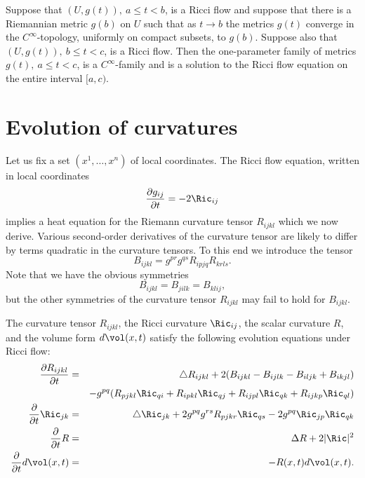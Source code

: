\begin{proposition}\label{prop:smooth-patching}
\label{patch}

 Suppose that $(U,g(t)),\ a\le t<b$, is a Ricci flow and suppose that
 there is a Riemannian metric $g(b)$ on $U$ such that
 as $t\rightarrow b$ the metrics $g(t)$ converge in the $C^\infty$-topology, uniformly
 on compact subsets, to $g(b)$. Suppose also that $(U,g(t)),\ b\le t<c$, is a
 Ricci flow. Then the one-parameter family of metrics $g(t), \ a\le
 t<c$, is a $C^\infty$-family and is a solution to the Ricci flow
 equation on the entire interval $[a,c)$.
 \end{proposition}


\section{Evolution of curvatures}\label{evolcurv}


Let us fix a set
$(x^1,\ldots,x^n)$ of local coordinates. The Ricci flow equation,
written in local coordinates
\[ \frac{\partial g_{ij}}{\partial t} =
-2\Ric_{ij}
\]  implies a heat equation for the Riemann
curvature tensor $R_{ijkl}$ which we now derive. Various second-order
derivatives of the curvature tensor are likely to differ by
terms quadratic in the curvature tensors. To this end we introduce
the tensor $$B_{ijkl} = g^{pr}g^{qs}R_{ipjq}R_{krls}.$$ Note that we
have the obvious symmetries
$$B_{ijkl} = B_{jilk} = B_{klij},$$ but the other symmetries of
the curvature tensor $R_{ijkl}$ may fail to hold for $B_{ijkl}$.

\smallskip

\begin{theorem}\label{thm:curvature-evolution}
\label{thmRmevol}

The curvature tensor $R_{ijkl}$, the Ricci curvature $\Ric_{ij}$, the scalar
curvature $R$, and the volume form $d\vol(x,t)$ satisfy the following evolution
equations under Ricci flow:
\begin{eqnarray}
\frac{\partial R_{ijkl}}{\partial t} &= & \triangle R_{ijkl} +2(B_{ijkl} -
B_{ijlk}-B_{iljk} + B_{ikjl})\nonumber \\&  &  - g^{pq}(R_{pjkl}\Ric_{qi} +
R_{ipkl}\Ric_{qj} + R_{ijpl}\Ric_{qk} +
R_{ijkp}\Ric_{ql}) \label{Rmevol} \\
\label{Ricevol} \frac{\partial}{\partial t}\Ric_{jk} & = & \triangle
\Ric_{jk}+2g^{pq}g^{rs}R_{pjkr}\Ric_{qs}-2g^{pq}\Ric_{jp}\Ric_{qk} \\
\label{Revol}\frac{\partial}{\partial t}R & = & \Delta R+2|\Ric|^2 \\
\label{dvolevol} \frac{\partial}{\partial t}d\vol(x,t) & = &
-R(x,t)d\vol(x,t).
\end{eqnarray}
\end{theorem}

